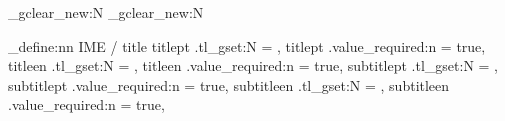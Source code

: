 \seq_gclear_new:N \@seqkeywordspt
\seq_gclear_new:N \@seqkeywordsen
\newcommand*{\palavrachave}[1]{\seq_gput_right:Nn \@seqkeywordspt {#1}}
\newcommand*{\keyword}[1]{\seq_gput_right:Nn \@seqkeywordsen {#1}}

\newcommand*{\@keywordspt}{\seq_use:Nn \@seqkeywordspt {.\space}.}
\newcommand*{\@keywordsen}{\seq_use:Nn \@seqkeywordsen {.\space}.}

\newcommand*{\@commakeywordspt}{\seq_use:Nn \@seqkeywordspt {,}}
\newcommand*{\@commakeywordsen}{\seq_use:Nn \@seqkeywordsen {,}}

\ExplSyntaxOff




\providecommand\@author{Julio Adolfo Zucon Trecenti}
\orientador{}
\providecommand\@program{Estatística}
\providecommand\@financing{}
\providecommand\@defenselocation{}
\providecommand\@license{CC-BY 4.0}
\providecommand\@title{}
\providecommand\@titlept{}
\providecommand\@titleen{}
\providecommand\@resumo{}
\providecommand\@abstract{}



\ExplSyntaxOn

\keys_define:nn { IME / title }
  {
    titlept .tl_gset:N = \@titlept,
    titlept .value_required:n = true,
    titleen .tl_gset:N = \@titleen,
    titleen .value_required:n = true,
    subtitlept .tl_gset:N = \@subtitlept,
    subtitlept .value_required:n = true,
    subtitleen .tl_gset:N = \@subtitleen,
    subtitleen .value_required:n = true,
  }

